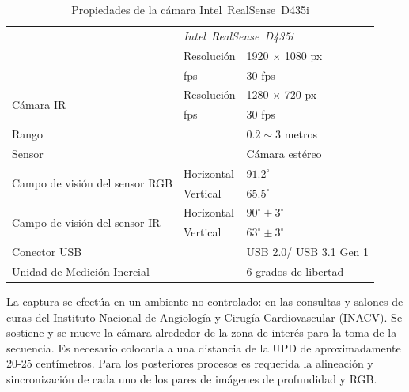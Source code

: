 \setlength{\tabcolsep}{0.5em} %
{\renewcommand{\arraystretch}{1.2}%
\begin{table}[ht]
	\centering
	\begin{tabular}{lll} 
		\hhline{===}
		& \multicolumn{2}{l}{\textit{Intel\textregistered~RealSense\texttrademark~D435i}}  \\ 
		\hhline{===}
		\multirow{2}{*}{Cámara RGB}                     & Resolución & 1920 $\times$ 1080 px                                       \\ 
		\cline{2-3}
		& fps        & 30 fps                                       \\ 
		\hline
		\multirow{2}{*}{Cámara IR}                      & Resolución &     1280 $\times$ 720 px                                   \\ 
		\cline{2-3}
		& fps        & 30 fps                                    \\ 
		\hline
		Rango                                           &            & $0.2\sim3$ metros                                \\ 
		\hline
		Sensor                                          &            & Cámara estéreo                                \\ 
		\hline
		\multirow{2}{*}{Campo de visión del sensor RGB} & Horizontal          & $91.2^\circ$                                       \\ 
		\cline{2-3}
		& Vertical         & $65.5^\circ$                                       \\ 
		\hline
		\multirow{2}{*}{Campo de visión del sensor IR}                    & Horizontal         & $90^\circ  \pm 3^\circ$                                     \\
		\cline{2-3}
		& Vertical         & $63^\circ  \pm 3^\circ$                                 \\ 
		\hline
		Conector USB                                             &            & USB 2.0/ USB 3.1 Gen 1                                    \\
		\hline
		Unidad de Medición Inercial & & 6 grados de libertad
		\\
		\hline
	\end{tabular}

	\caption{Propiedades de la cámara Intel\textregistered~RealSense\texttrademark~D435i} 
	\label{tab:d435i}
\end{table}

La captura se efectúa en un ambiente no controlado: en las consultas y salones de curas del Instituto Nacional de Angiología y Cirugía Cardiovascular (INACV). Se sostiene y se mueve la cámara alrededor de la zona de interés para la toma de la secuencia. Es necesario colocarla a una distancia de la UPD de aproximadamente 20-25 centímetros. Para los posteriores procesos es requerida la alineación y sincronización de cada uno de los pares de imágenes de profundidad y RGB.

}

